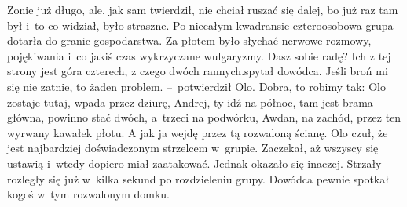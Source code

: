 \documentclass[../MAIN.tex]{subfiles}
\begin{document}
Zonie już długo, ale, jak sam twierdził, nie chciał ruszać się dalej, bo już raz
tam był i~to co widział, było straszne.
\pp
Po niecałym kwadransie czteroosobowa grupa dotarła do granic gospodarstwa. Za
płotem było słychać nerwowe rozmowy, pojękiwania i~co jakiś czas wykrzyczane
wulgaryzmy.
\dd
\sd
\xx Dasz sobie radę? Ich z tej strony jest góra czterech, z czego dwóch rannych.\x spytał dowódca.
\xx Jeśli broń mi się nie zatnie, to żaden problem. --~potwierdził Olo.
\xx Dobra, to robimy tak: Olo zostaje tutaj, wpada przez dziurę, Andrej, ty idź
na północ, tam jest brama główna, powinno stać dwóch, a~trzeci na podwórku,
Awdan, na zachód, przez ten wyrwany kawałek płotu. A ja\3k ja wejdę przez tą
rozwaloną ścianę.
\qd
\dd
Olo czuł, że jest najbardziej doświadczonym strzelcem w~grupie. Zaczekał, aż
wszyscy się ustawią i~wtedy dopiero miał zaatakować. Jednak okazało się inaczej.
Strzały rozległy się już w~kilka sekund po rozdzieleniu grupy. Dowódca pewnie
spotkał kogoś w~tym rozwalonym domku.%
\end{document}
